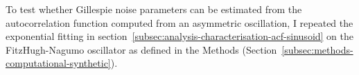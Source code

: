 %


To test whether Gillespie noise parameters can be estimated from the autocorrelation function computed from an asymmetric oscillation, I repeated the exponential fitting in section~\ref{subsec:analysis-characterisation-acf-sinusoid} on the FitzHugh-Nagumo oscillator as defined in the Methods (Section~\ref{subsec:methods-computational-synthetic}).

